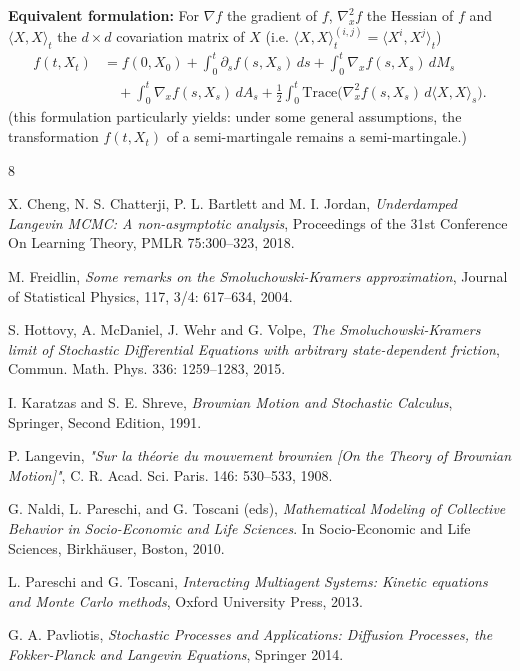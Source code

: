 \documentclass[11pt]{article}
\theoremstyle{remark}
\begin{document}
\noindent\textbf{Equivalent formulation:}
For $\nabla f$ the gradient of $f$, $\nabla_x^2f$ the Hessian of $f$ and $\langle X,X\rangle_t$ the $d\times d$ covariation matrix of $X$ (i.e. $\langle X,X\rangle_t^{(i,j)}=\langle X^i,X^j\rangle_t$)
\[
\begin{aligned}
f(t,X_t)
&=f(0,X_0)+\int_0^t \partial_s f(s,X_s)\,ds+\int_0^t \nabla_x f(s,X_s)\,dM_s \\
&\quad +\int_0^t \nabla_x f(s,X_s)\,dA_s+\frac{1}{2}\int_0^t \mathrm{Trace}\bigl(\nabla_x^2 f(s,X_s)\,d\langle X,X\rangle_s\bigr).
\end{aligned}
\]
(this formulation particularly yields: under some general assumptions, the transformation $f(t,X_t)$ of a semi-martingale remains a semi-martingale.)



\begin{thebibliography}{8}

X. Cheng, N. S. Chatterji, P. L. Bartlett and M. I. Jordan,
\textit{Underdamped Langevin MCMC: A non-asymptotic analysis},
Proceedings of the 31st Conference On Learning Theory,
PMLR 75:300--323, 2018.

M. Freidlin,
\textit{Some remarks on the Smoluchowski-Kramers approximation},
Journal of Statistical Physics, 117, 3/4: 617--634, 2004.

S. Hottovy, A. McDaniel, J. Wehr and G. Volpe,
\textit{The Smoluchowski-Kramers limit of Stochastic Differential Equations with arbitrary state-dependent friction},
Commun. Math. Phys. 336: 1259--1283, 2015.

I. Karatzas and S. E. Shreve,
\textit{Brownian Motion and Stochastic Calculus},
Springer, Second Edition, 1991.

P. Langevin,
\textit{"Sur la théorie du mouvement brownien [On the Theory of Brownian Motion]"},
C. R. Acad. Sci. Paris. 146: 530--533, 1908.

G. Naldi, L. Pareschi, and G. Toscani (eds),
\textit{Mathematical Modeling of Collective Behavior in Socio-Economic and Life Sciences}.
In Socio-Economic and Life Sciences, Birkh\"auser, Boston, 2010.

L. Pareschi and G. Toscani,
\textit{Interacting Multiagent Systems: Kinetic equations and Monte Carlo methods},
Oxford University Press, 2013.

G. A. Pavliotis,
\textit{Stochastic Processes and Applications: Diffusion Processes, the Fokker-Planck and Langevin Equations},
Springer 2014.

\end{thebibliography}
\end{document}
